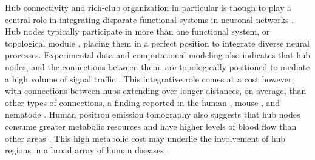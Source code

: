 \documentclass[10pt,letterpaper]{article}
\begin{document}
Hub connectivity and rich-club organization in particular is though to play a central role in integrating disparate functional systems in neuronal networks \cite{Fornito:2015dq, VandenHeuvel2013a, ZamoraLopez:2010hy, Crossley2014, Crossley:2013kl}.
Hub nodes typically participate in more than one functional system, or topological module \cite{deReus:2013cy, deReus:2014cz, ZamoraLopez:2010hy}, placing them in a perfect position to integrate diverse neural processes.
Experimental data and computational modeling also indicates that hub nodes, and the connections between them, are topologically positioned to mediate a high volume of signal traffic \cite{vandenHeuvel:2012kh, Harriger:2012bb, Misic:2014it, Misic:2015jw}.
This integrative role comes at a cost however, with connections between hubs extending over longer distances, on average, than other types of connections, a finding reported in the human \cite{vandenHeuvel:2012kh}, mouse \cite{Fulcher:2016ck}, and nematode \cite{Towlson:2013gf}.
Human positron emission tomography also suggests that hub nodes consume greater metabolic resources and have higher levels of blood flow than other areas \cite{Tomasi:2013kl, Collin:2014kq, Liang2013a}.
This high metabolic cost may underlie the involvement of hub regions in a broad array of human diseases \cite{Fornito2015, Bullmore:2012vl, Crossley:2014eta}.
\end{document}
